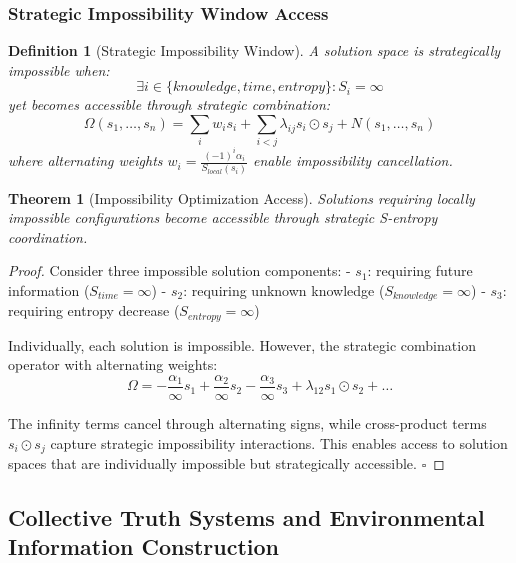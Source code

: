 \documentclass[12pt,a4paper]{article}
\newtheorem{theorem}{Theorem}
\newtheorem{definition}{Definition}
\begin{document}
\subsubsection{Strategic Impossibility Window Access}

\begin{definition}[Strategic Impossibility Window]
A solution space is strategically impossible when:
\begin{equation}
\exists i \in \{knowledge, time, entropy\} : S_i = \infty
\end{equation}
yet becomes accessible through strategic combination:
\begin{equation}
\Omega(s_1, \ldots, s_n) = \sum_i w_i s_i + \sum_{i<j} \lambda_{ij} s_i \odot s_j + N(s_1, \ldots, s_n)
\end{equation}
where alternating weights $w_i = \frac{(-1)^i \alpha_i}{S_{local}(s_i)}$ enable impossibility cancellation.
\end{definition}

\begin{theorem}[Impossibility Optimization Access]
Solutions requiring locally impossible configurations become accessible through strategic S-entropy coordination.
\end{theorem}

\begin{proof}
Consider three impossible solution components:
- $s_1$: requiring future information ($S_{time} = \infty$)
- $s_2$: requiring unknown knowledge ($S_{knowledge} = \infty$) 
- $s_3$: requiring entropy decrease ($S_{entropy} = \infty$)

Individually, each solution is impossible. However, the strategic combination operator with alternating weights:
\begin{equation}
\Omega = -\frac{\alpha_1}{\infty}s_1 + \frac{\alpha_2}{\infty}s_2 - \frac{\alpha_3}{\infty}s_3 + \lambda_{12}s_1\odot s_2 + \ldots
\end{equation}

The infinity terms cancel through alternating signs, while cross-product terms $s_i \odot s_j$ capture strategic impossibility interactions. This enables access to solution spaces that are individually impossible but strategically accessible. $\square$
\end{proof}

\subsection{Collective Truth Systems and Environmental Information Construction}
\end{document}
